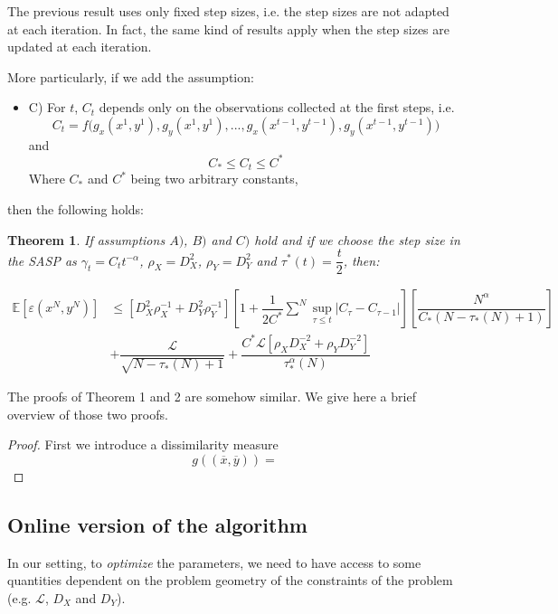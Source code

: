 \documentclass[12pt,reqno]{amsart}
\newtheorem{thm}{Theorem}[section]
\numberwithin{equation}{section}
\begin{document}
The previous result uses only fixed step sizes, i.e. the step sizes are not adapted at each iteration.
In fact, the same kind of results apply when the step sizes are updated at each iteration.

More particularly, if we add the assumption:

\begin{itemize}
\item C) For $t$, $C_{t}$ depends only on the observations collected at the first steps, i.e. 
$$C_{t} = f\big(g_{x}(x^{1},y^{1}),g_{y}(x^{1},y^{1}),...,g_{x}(x^{t-1},y^{t-1}),g_{y}(x^{t-1},y^{t-1})\big)$$
and 
$$
C_{*} \leq C_{t} \leq C^{*}
$$
Where $C_{*}$ and $C^{*}$ being two arbitrary constants,

\end{itemize}

then the following holds:

\begin{thm}
If assumptions $A)$, $B)$ and $C)$ hold and if we choose the step size in the SASP as $\gamma_{t} = C_{t}t^{-\alpha}$,
$\rho_{X} = D_{X}^{2}$, $\rho_{Y} = D_{Y}^{2}$ and $\tau^{*}(t) = \dfrac{t}{2}$, then:

\begin{align*}
\mathbb{E}[\varepsilon(x^{N},y^{N})] &\leq [D_{X}^{2}\rho_{X}^{-1} + D_{Y}^{2}\rho_{Y}^{-1} ][1 + \dfrac{1}{2C^{*}}\sum_{}^{N}\sup_{\tau \leq t} | C_{\tau} - C_{\tau-1}|]
[\dfrac{N^{\alpha}}{C_{*}(N - \tau_{*}(N) + 1)}] \\ 
&+ \dfrac{\mathcal{L}}{\sqrt{N - \tau_{*}(N)+ 1}} + \dfrac{C^{*}\mathcal{L}[\rho_{X}D_{X}^{-2} + \rho_{Y}D_{Y}^{-2}]}{\tau_{*}^{\alpha}(N)}
\end{align*}
\end{thm}


The proofs of Theorem 1 and 2 are somehow similar.
We give here a brief overview of those two proofs.

\begin{proof}

First we introduce a dissimilarity measure
$$
g((\overline{x},\overline{y})) = 
$$

\end{proof}

\subsection{Online version of the algorithm}

In our setting, to \emph{optimize} the parameters, we need to have access to some quantities dependent on the problem geometry of the constraints of the problem (e.g. $\mathcal{L}$, $D_{X}$ and $D_{Y}$).
\end{document}
